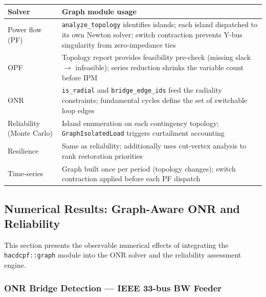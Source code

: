 \begin{center}
\begin{tabular}{lp{9.5cm}}
\hline\hline
\textbf{Solver} & \textbf{Graph module usage} \\
\hline
Power flow (PF)           & \texttt{analyze\_topology} identifies islands; each
                            island dispatched to its own Newton solver; switch
                            contraction prevents Y-bus singularity from
                            zero-impedance ties \\
OPF                       & Topology report provides feasibility pre-check
                            (missing slack $\to$ infeasible); series reduction
                            shrinks the variable count before IPM \\
ONR                       & \texttt{is\_radial} and \texttt{bridge\_edge\_ids}
                            feed the radiality constraints; fundamental cycles
                            define the set of switchable loop edges \\
Reliability (Monte Carlo) & Island enumeration on each contingency topology;
                            \texttt{GraphIsolatedLoad} triggers curtailment
                            accounting \\
Resilience                & Same as reliability; additionally uses cut-vertex
                            analysis to rank restoration priorities \\
Time-series               & Graph built once per period (topology changes);
                            switch contraction applied before each PF dispatch \\
\hline\hline
\end{tabular}
\end{center}

\subsection{Numerical Results: Graph-Aware ONR and Reliability}
\label{sec:graph-numerical}

This section presents the observable numerical effects of integrating the
\texttt{hacdcpf::graph} module into the ONR solver and the reliability
assessment engine.

\subsubsection{ONR Bridge Detection --- IEEE 33-bus BW Feeder}

